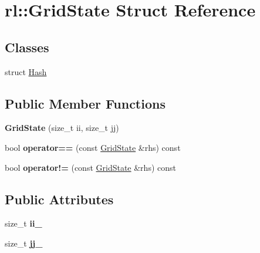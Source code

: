 \hypertarget{structrl_1_1_grid_state}{}\section{rl\+:\+:Grid\+State Struct Reference}
\label{structrl_1_1_grid_state}
\subsection*{Classes}
\begin{DoxyCompactItemize}
\item 
struct \hyperlink{structrl_1_1_grid_state_1_1_hash}{Hash}
\end{DoxyCompactItemize}
\subsection*{Public Member Functions}
\begin{DoxyCompactItemize}
\item 
\hypertarget{structrl_1_1_grid_state_a7aee8d309c9081f8b9f28d09eed9cc8d}{}\label{structrl_1_1_grid_state_a7aee8d309c9081f8b9f28d09eed9cc8d} 
{\bfseries Grid\+State} (size\+\_\+t ii, size\+\_\+t jj)
\item 
\hypertarget{structrl_1_1_grid_state_a51463b19682deac1da7d9b20549145df}{}\label{structrl_1_1_grid_state_a51463b19682deac1da7d9b20549145df} 
bool {\bfseries operator==} (const \hyperlink{structrl_1_1_grid_state}{Grid\+State} \&rhs) const
\item 
\hypertarget{structrl_1_1_grid_state_ab32fce6e0df7d27bb17483e141b54ada}{}\label{structrl_1_1_grid_state_ab32fce6e0df7d27bb17483e141b54ada} 
bool {\bfseries operator!=} (const \hyperlink{structrl_1_1_grid_state}{Grid\+State} \&rhs) const
\end{DoxyCompactItemize}
\subsection*{Public Attributes}
\begin{DoxyCompactItemize}
\item 
\hypertarget{structrl_1_1_grid_state_a91bf4c50c85c2980c6213c72ec468691}{}\label{structrl_1_1_grid_state_a91bf4c50c85c2980c6213c72ec468691} 
size\+\_\+t {\bfseries ii\+\_\+}
\item 
\hypertarget{structrl_1_1_grid_state_aa53f8a955bb8507589d0c023c5e3f958}{}\label{structrl_1_1_grid_state_aa53f8a955bb8507589d0c023c5e3f958} 
size\+\_\+t {\bfseries jj\+\_\+}
\end{DoxyCompactItemize}


